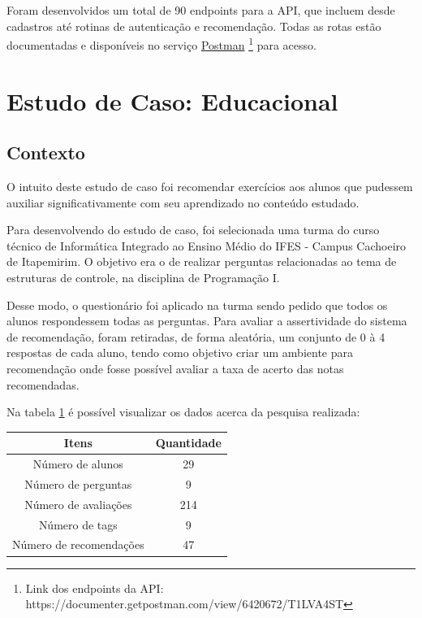 Foram desenvolvidos um total de 90 endpoints para a API, que incluem desde cadastros até rotinas de autenticação e recomendação. Todas as rotas estão documentadas e disponíveis no serviço \href{https://documenter.getpostman.com/view/6420672/T1LVA4ST}{Postman} \footnote{Link dos endpoints da API: https://documenter.getpostman.com/view/6420672/T1LVA4ST} para acesso.

\section{Estudo de Caso: Educacional}

\subsection{Contexto}

O intuito deste estudo de caso foi recomendar exercícios aos alunos que pudessem auxiliar significativamente com seu aprendizado no conteúdo estudado.

Para desenvolvendo do estudo de caso, foi selecionada uma turma do curso técnico de Informática Integrado ao Ensino Médio do IFES - Campus Cachoeiro de Itapemirim. O objetivo era o de realizar perguntas relacionadas ao tema de estruturas de controle, na disciplina de Programação I.

Desse modo, o questionário foi aplicado na turma sendo pedido que todos os alunos respondessem todas as perguntas. Para avaliar a assertividade do sistema de recomendação, foram retiradas, de forma aleatória, um conjunto de 0 à 4 respostas de cada aluno, tendo como objetivo criar um ambiente para recomendação onde fosse possível avaliar a taxa de acerto das notas recomendadas.

Na tabela \ref{table:resultadosEstudoCasoEdu} é possível visualizar os dados acerca da pesquisa realizada:

\begin{table}[H]
\centering
\begin{tabular}{|c|c|}
\hline
\textbf{Itens}          & \textbf{Quantidade} \\ \hline
Número de alunos        & 29                  \\ \hline
Número de perguntas     & 9                   \\ \hline
Número de avaliações    & 214                 \\ \hline
Número de tags          & 9                   \\ \hline
Número de recomendações & 47                  \\ \hline
\end{tabular}
\label{table:resultadosEstudoCasoEdu} 
\end{table}